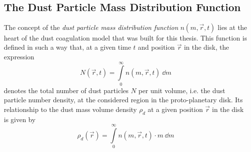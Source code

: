 \begin{figure}[h!]
\begin{minipage}{.5\linewidth}
{
          	}
        \end{minipage}
        \caption{
             \\ 
        }
        \label{}
    \end{figure}


\clearpage\subsection{The Dust Particle Mass Distribution Function}
\label{sec:dust_particle_mass_distribution}

    The concept of the \textit{dust particle mass distribution function} $n(m, \vec r, t)$ 
    lies at the heart of the dust coagulation model that was built for this thesis. 
    This function is defined in such a way that, at a given time $t$ and position $\vec r$ 
    in the disk, the expression
    \begin{equation}
        N(\vec r, t) =\int\limits_0^\infty n(m,\vec r, t)\ \dd m
    \end{equation}
    denotes the total number of dust particles $N$ per unit volume, i.e. the dust particle
    number density, at the considered region in the proto-planetary disk. 
    Its relationship to the dust mass volume density $\rho_d$ at a given position $\vec r$ 
    in the disk is given by
    \begin{equation}
        \label{eq:relationship_between_dust_particle_mass_distribution_and_mass_volume_density}
        \rho_d(\vec r) =\int\limits_0^\infty n(m,\vec r, t)\cdot m\ \dd m
    \end{equation}


